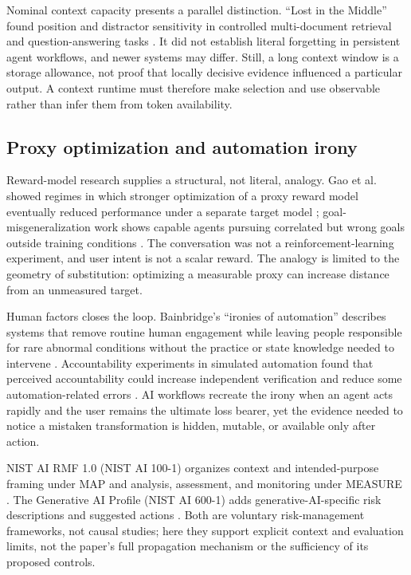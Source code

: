 \documentclass[10pt,a4paper]{article}
\begin{document}
Nominal context capacity presents a parallel distinction. ``Lost in the Middle'' found position and distractor sensitivity in controlled multi-document retrieval and question-answering tasks \cite{lostmiddle}. It did not establish literal forgetting in persistent agent workflows, and newer systems may differ. Still, a long context window is a storage allowance, not proof that locally decisive evidence influenced a particular output. A context runtime must therefore make selection and use observable rather than infer them from token availability.

\subsection{Proxy optimization and automation irony}

Reward-model research supplies a structural, not literal, analogy. Gao et al. showed regimes in which stronger optimization of a proxy reward model eventually reduced performance under a separate target model \cite{gao2023}; goal-misgeneralization work shows capable agents pursuing correlated but wrong goals outside training conditions \cite{langosco2022}. The conversation was not a reinforcement-learning experiment, and user intent is not a scalar reward. The analogy is limited to the geometry of substitution: optimizing a measurable proxy can increase distance from an unmeasured target.

Human factors closes the loop. Bainbridge's ``ironies of automation'' describes systems that remove routine human engagement while leaving people responsible for rare abnormal conditions without the practice or state knowledge needed to intervene \cite{bainbridge1983}. Accountability experiments in simulated automation found that perceived accountability could increase independent verification and reduce some automation-related errors \cite{mosier1996}. AI workflows recreate the irony when an agent acts rapidly and the user remains the ultimate loss bearer, yet the evidence needed to notice a mistaken transformation is hidden, mutable, or available only after action.

NIST AI RMF 1.0 (NIST AI 100-1) organizes context and intended-purpose framing under MAP and analysis, assessment, and monitoring under MEASURE \cite{nistairmf}. The Generative AI Profile (NIST AI 600-1) adds generative-AI-specific risk descriptions and suggested actions \cite{nistgenai}. Both are voluntary risk-management frameworks, not causal studies; here they support explicit context and evaluation limits, not the paper's full propagation mechanism or the sufficiency of its proposed controls.
\end{document}

